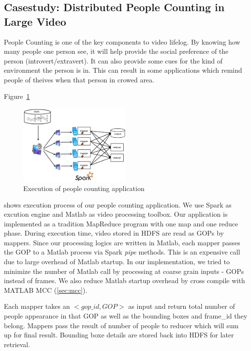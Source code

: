 \subsection{Casestudy: Distributed People Counting in Large Video}
People Counting is one of the key components to video lifelog. By knowing how
many people one person see, it will help provide the social preference of the
person (introvert/extravert). It can also provide some cues for the kind of
environment the person is in. This can result in some applications which remind
people of theives when that person in crowed area.

Figure~\ref{fig:overview}\begin{figure}[htbp!]\centering
\vspace{-1ex}
\includegraphics[width=0.5\textwidth]{figures/overview.pdf}
\vspace{-4ex}
\caption{Execution of people counting application}
\label{fig:overview}
\end{figure} shows execution process of our people counting
application. We use Spark as excution engine and Matlab as video processing
toolbox. Our application is implemented as a tradition MapReduce program with
one map and one reduce phase. During execution time, video stored in HDFS are read as GOPs by mappers. Since our processing logics are written in Matlab,
each mapper passes the GOP to a Matlab process via Spark \textit{pipe} methods.
This is an expensive call due to large overhead of Matlab startup. In our
implementation, we tried to minimize the number of Matlab call by processing at
coarse grain inputs - GOPs instead of frames. We also reduce Matlab startup
overhead by cross compile with MATLAB MCC (\textsection\ref{sec:mcc}).

Each mapper takes an $<gop\_id, GOP>$ as input and return total number of people
appearance in that GOP as well as the bounding boxes and frame\_id they belong.
Mappers pass the result of number of people to reducer which will sum up for
final result. Bounding boxe details are stored back into HDFS for later
retrieval.

